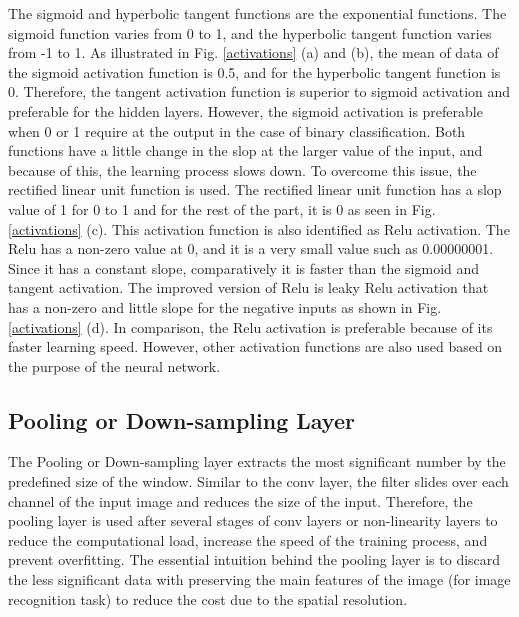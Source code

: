 The sigmoid and hyperbolic tangent functions are the exponential functions. The sigmoid function varies from 0 to 1, and the hyperbolic tangent function varies from -1 to 1. As illustrated in Fig. \ref{activations} (a) and (b), the mean of data of the sigmoid activation function is 0.5, and for the hyperbolic tangent function is 0. Therefore, the tangent activation function is superior to sigmoid activation and preferable for the hidden layers. However, the sigmoid activation is preferable when 0 or 1 require at the output in the case of binary classification. Both functions have a little change in the slop at the larger value of the input, and because of this, the learning process slows down. To overcome this issue, the rectified linear unit function is used. The rectified linear unit function has a slop value of 1 for 0 to 1 and for the rest of the part, it is 0 as seen in Fig. \ref{activations} (c). This activation function is also identified as Relu activation. The Relu has a non-zero value at 0, and it is a very small value such as 0.00000001. Since it has a constant slope, comparatively it is faster than the sigmoid and tangent activation. The improved version of Relu is leaky Relu activation that has a non-zero and little slope for the negative inputs as shown in Fig. \ref{activations} (d). In comparison, the Relu activation is preferable because of its faster learning speed. However, other activation functions are also used based on the purpose of the neural network.       

\subsection{Pooling or Down-sampling Layer}
The Pooling or Down-sampling layer extracts the most significant number by the predefined size of the window. Similar to the conv layer, the filter slides over each channel of the input image and reduces the size of the input. Therefore,  the pooling layer is used after several stages of conv layers or non-linearity layers to reduce the computational load, increase the speed of the training process, and prevent overfitting. The essential intuition behind the pooling layer is to discard the less significant data with preserving the main features of the image (for image recognition task) to reduce the cost due to the spatial resolution.  

